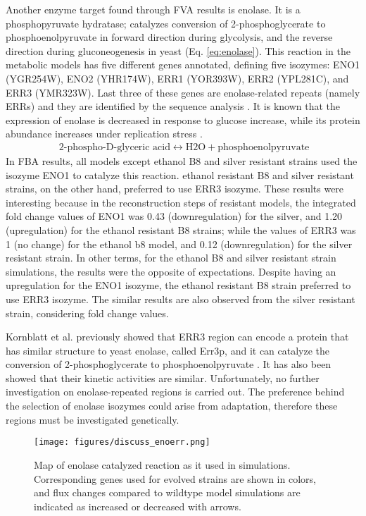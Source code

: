 Another enzyme target found through FVA results is enolase. It is a phosphopyruvate hydratase; catalyzes conversion of 2-phosphoglycerate to phosphoenolpyruvate in forward direction during glycolysis, and the reverse direction during gluconeogenesis in yeast (Eq. \ref{eq:enolase}). This reaction in the metabolic models has five different genes annotated, defining five isozymes: ENO1 (YGR254W), ENO2 (YHR174W), ERR1 (YOR393W), ERR2 (YPL281C), and ERR3 (YMR323W). Last three of these genes are enolase-related repeats (namely ERRs) and they are identified by the sequence analysis \cite{pryde1995sequence}. It is known that the expression of enolase is decreased in response to glucose increase, while its protein abundance increases under replication stress \cite{tkach2012dissecting}.
\begin{align}
  \label{eq:enolase}
  \ \text{2-phospho-D-glyceric acid} \leftrightarrow \text{H2O} + \text{phosphoenolpyruvate}
\end{align}
In FBA results, all models except ethanol B8 and silver resistant strains used the isozyme ENO1 to catalyze this reaction. ethanol resistant B8 and silver resistant strains, on the other hand, preferred to use ERR3 isozyme. These results were interesting because in the reconstruction steps of resistant models, the integrated fold change values of ENO1 was 0.43 (downregulation) for the silver, and 1.20 (upregulation) for the ethanol resistant B8 strains; while the values of ERR3 was 1 (no change) for the ethanol b8 model, and 0.12 (downregulation) for the silver resistant strain. In other terms, for the ethanol B8 and silver resistant strain simulations, the results were the opposite of expectations. Despite having an upregulation for the ENO1 isozyme, the ethanol resistant B8 strain preferred to use ERR3 isozyme. The similar results are also observed from the silver resistant strain, considering fold change values.

Kornblatt et al. previously showed that ERR3 region can encode a protein that has similar structure to yeast enolase, called Err3p, and it can catalyze the conversion of 2-phosphoglycerate to phosphoenolpyruvate \cite{kornblatt2013saccharomyces}. It has also been showed that their kinetic activities are similar. Unfortunately, no further investigation on enolase-repeated regions is carried out. The preference behind the selection of enolase isozymes could arise from adaptation, therefore these regions must be investigated genetically.

\begin{figure}[H]
\texttt{[image: figures/discuss\_enoerr.png]}
\caption[Map of enolase catalyzed reaction as it used in simulations]{Map of enolase catalyzed reaction as it used in simulations. Corresponding genes used for evolved strains are shown in colors, and flux changes compared to wildtype model simulations are indicated as increased or decreased with arrows.}
\label{fig:discuss_ENOERR}
\end{figure}


